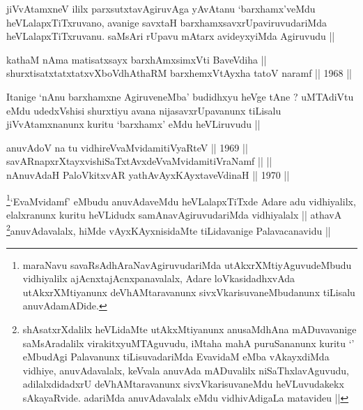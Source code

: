 \begin{artha}
jiVvAtamxneV ililx parxsutxtavAgiruvAga yAvAtanu `barxhamx'veMdu
heVLalapxTiTxruvano, avanige savxtaH barxhamxsavxrUpaviruvudariMda
heVLalapxTiTxruvanu. saMsAri rUpavu mAtarx avideyxyiMda Agiruvudu ||
\end{artha}


\begin{shl}
kathaM nAma matisatxsayx barxhAmxsimxVti BaveVdiha || \\
shurxtisatxtatxtatxvXboVdhAthaRM barxhemxVtAyxha tatoV naramf ||  1968 ||  
\end{shl}

\begin{artha}
Itanige `nAnu barxhamxne AgiruveneMba' budidhxyu heVge tAne ?
uMTAdiVtu eMdu udedxVshisi shurxtiyu avana nijasavxrUpavanunx tiLisalu
jiVvAtamxnanunx kuritu `barxhamx' eMdu heVLiruvudu ||
\end{artha}


\begin{shl}
anuvAdoV na tu vidhireVvaMvidamitiVyaRteV ||  1969 || \\
savARnapxrXtayxvishiSaTxtAvxdeVvaMvidamitiVraNamf ||  || \\
nAnuvAdaH PaloVkitxvAR yathAvAyxKAyxtaveVdinaH ||  1970 ||  
\end{shl}

\begin{artha}
\footnote[1]{maraNavu savaRsAdhAraNavAgiruvudariMda
  utAkxrXMtiyAguvudeMbudu vidhiyalilx ajAcnxtajAcnxpanavalalx, Adare
  loVkasidadhxvAda utAkxrXMtiyanunx deVhAMtaravanunx
  sivxVkarisuvaneMbudanunx tiLisalu anuvAdamADide.}`EvaMvidamf' eMbudu anuvAdaveMdu heVLalapxTiTxde Adare
adu vidhiyalilx, elalxranunx kuritu heVLidudx samAnavAgiruvudariMda
vidhiyalalx || athavA \footnote[2]{shAsatxrXdalilx heVLidaMte
  utAkxMtiyanunx anusaMdhAna mADuvavanige saMsAradalilx
  virakitxyuMTAguvudu, iMtaha mahA puruSananunx kuritu `\stext'
  eMbudAgi Palavanunx tiLisuvadariMda EvavidaM eMba vAkayxdiMda
  vidhiye, anuvAdavalalx, keVvala anuvAda mADuvalilx
  niSaThxlavAguvudu, adilalxdidadxrU deVhAMtaravanunx
  sivxVkarisuvaneMdu heVLuvudakekx sAkayaRvide. adariMda anuvAdavalalx
eMdu vidhivAdigaLa matavideu ||}anuvAdavalalx, hiMde
vAyxKAyxnisidaMte tiLidavanige Palavacanavidu ||
\end{artha}

